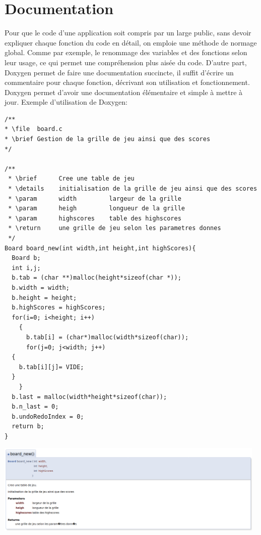 \documentclass{report}
\begin{document}
\section{Documentation}
Pour que le code d'une application soit compris par un large public, sans devoir expliquer chaque fonction du code en détail, on emploie une méthode de normage global. Comme par exemple, le renommage des variables et des fonctions selon leur usage, ce qui permet une compréhension plus aisée du code. D'autre part, Doxygen permet de faire une documentation succincte, il suffit d'écrire un commentaire pour chaque fonction, décrivant son utilisation et fonctionnement. Doxygen permet d'avoir une documentation élémentaire et simple à mettre à jour.
Exemple d'utilisation de Doxygen:
\begin{scriptsize}
\begin{lstlisting}
/**
* \file  board.c
* \brief Gestion de la grille de jeu ainsi que des scores 
*/

/**
 * \brief      Cree une table de jeu
 * \details    initialisation de la grille de jeu ainsi que des scores
 * \param      width         largeur de la grille
 * \param      heigh         longueur de la grille
 * \param      highscores    table des highscores
 * \return     une grille de jeu selon les parametres donnes
 */
Board board_new(int width,int height,int highScores){
  Board b;
  int i,j;
  b.tab = (char **)malloc(height*sizeof(char *));
  b.width = width;
  b.height = height;
  b.highScores = highScores;
  for(i=0; i<height; i++)
    {
      b.tab[i] = (char*)malloc(width*sizeof(char));
      for(j=0; j<width; j++)
  {
    b.tab[i][j]= VIDE;
  }
    }
  b.last = malloc(width*height*sizeof(char));
  b.n_last = 0;
  b.undoRedoIndex = 0;
  return b;
}

\end{lstlisting}
\end{scriptsize}
\begin{center}
\includegraphics[width=13cm]{board.png}
\end{center}
\end{document}
